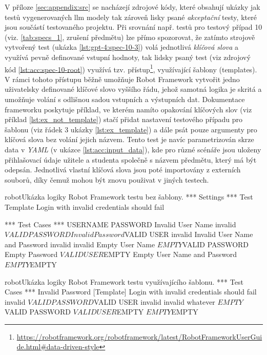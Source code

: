\documentclass[czech, ma, kiv, he, iso690numb, pdf, viewonly]{fasthesis}
\begin{document}
        V příloze \ref{sec:appendix:src} se nacházejí zdrojové kódy, které obsahují ukázky jak testů vygenerovaných \Gls{llm} modely tak zároveň lisky psané \textit{akceptační} testy, které jsou součástí testovaného projektu. Při srovnání např. testů pro testový případ 10 (viz. \ref{tab:specs_1}, zrušení předmětu) lze přímo spozorovat, že zatímto strojově vytvořený test (ukázka \ref{lst:gpt-4:spec-10-3}) volá jednotlivá \textit{klíčová slova} a využívá pevně definované vstupní hodnoty, tak lidsky psaný test (viz zdrojový kód \ref{lst:acc:spec-10-root}) využívá tzv.  přístup\footnote{\url{https://robotframework.org/robotframework/latest/RobotFrameworkUserGuide.html#data-driven-style}}, využívající šablony (templates). V rámci tohoto přístupu běžně umožňuje Robot Framework vytvořit jedno uživatelsky definované klíčové slovo vyššího řádu, jehož samotná logika je skritá a umožňuje volání s odlišnou sadou vstupních a výstupních dat. Dokumentace frameworku poskytuje příklad, ve kterém namíto opakování klíčových slov (viz příklad \ref{lst:ex_not_template}) stačí přidat nastavení testového případu pro šablonu (viz řádek 3 ukázky \ref{lst:ex_template}) a dále psát pouze argumenty pro klíčová slova bez volání jejich názvem. Tento test je navíc parametrizován skrze data v \textit{YAML} (v ukázce \ref{lst:acc:input_data}), kde pro různé scénáře jsou uloženy přihlašovací údaje užitele a studenta společně s názvem předmětu, který má být odepsán. Jednotlivá vlastní klíčová slova jsou poté importovány z externích souborů, díky čemuž mohou být znovu použivat v jiných testech.

        \begin{code}{robot}{Ukázka logiky Robot Framework testu bez šablony. \label{lst:ex_not_template}}
*** Settings ***
Test Template    Login with invalid credentials should fail

*** Test Cases ***                USERNAME         PASSWORD
Invalid User Name                 invalid          ${VALID PASSWORD}
Invalid Password                  ${VALID USER}    invalid
Invalid User Name and Password    invalid          invalid
Empty User Name                   ${EMPTY}         ${VALID PASSWORD}
Empty Password                    ${VALID USER}    ${EMPTY}
Empty User Name and Password      ${EMPTY}         ${EMPTY}\end{code}

        \begin{code}{robot}{Ukázka logiky Robot Framework testu využívajícího šablonu. \label{lst:ex_template}}
*** Test Cases ***
Invalid Password
    [Template]    Login with invalid credentials should fail
    invalid          ${VALID PASSWORD}
    ${VALID USER}    invalid
    invalid          whatever
    ${EMPTY}         ${VALID PASSWORD}
    ${VALID USER}    ${EMPTY}
    ${EMPTY}         ${EMPTY}\end{code}
\end{document}
